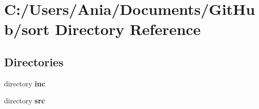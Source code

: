 \section{C\-:/\-Users/\-Ania/\-Documents/\-Git\-Hub/sort Directory Reference}
\label{dir_e213714b696e3e932077415b5ba52d38}
\subsection*{Directories}
\begin{DoxyCompactItemize}
\item 
directory {\bf inc}
\item 
directory {\bf src}
\end{DoxyCompactItemize}
